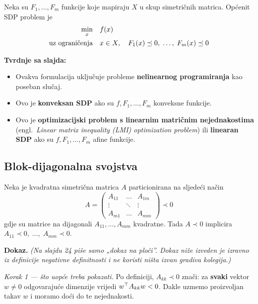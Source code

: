 \begin{definicija}
Neka su $F_1,\dots,F_m$ funkcije koje mapiraju $X$ u skup simetričnih matrica.
Općenit SDP problem je
\begin{equation}
\label{eq:sdp}
\begin{aligned}
\min_x \quad & f(x) \\
\uzogr & x \in X, \quad F_1(x) \preceq 0,\; \dots,\; F_m(x) \preceq 0
\end{aligned}
\end{equation}
\end{definicija}

\textbf{Tvrdnje sa slajda:}

\begin{itemize}
  \item Ovakva formulacija uključuje probleme \textbf{nelinearnog
        programiranja} kao poseban slučaj.
  \item Ovo je \textbf{konveksan SDP} ako su $f, F_1,\dots,F_m$ konveksne
        funkcije.
  \item Ovo je \textbf{optimizacijski problem s linearnim matričnim
        nejednakostima} (engl.\ \emph{Linear matrix inequality (LMI)
        optimization problem}) ili \textbf{linearan SDP} ako su
        $f, F_1,\dots,F_m$ afine funkcije.
\end{itemize}

\subsection{Blok-dijagonalna svojstva}

\begin{teorem}
Neka je kvadratna simetrična matrica $A$ particionirana na sljedeći način
\[
A = \begin{pmatrix}
A_{11} & \dots & A_{1m} \\
\vdots & \ddots & \vdots \\
A_{m1} & \dots & A_{mm}
\end{pmatrix} \prec 0
\]
gdje su matrice na dijagonali $A_{11},\dots,A_{mm}$ kvadratne. Tada
$A \prec 0$ implicira $A_{11} \prec 0,\; \dots,\; A_{mm} \prec 0$.
\end{teorem}

\textbf{Dokaz.} \emph{(Na slajdu 24 piše samo „dokaz na ploči”. Dokaz niže
izveden je izravno iz definicije negativne definitnosti i ne koristi ništa
izvan gradiva kolegija.)}

\emph{Korak 1 --- što uopće treba pokazati.} Po definiciji, $A_{kk} \prec 0$
znači: za \textbf{svaki} vektor $w \ne 0$ odgovarajuće dimenzije vrijedi
$w\T A_{kk} w < 0$. Dakle uzmemo proizvoljan takav $w$ i moramo doći do te
nejednakosti.

